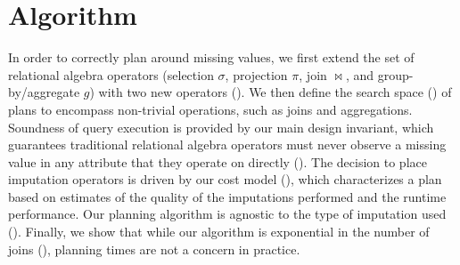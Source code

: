 \section{Algorithm}
\label{sec:algorithm}
In order to correctly plan around missing values, we first extend the set of relational algebra operators (selection $\sigma$, projection $\pi$, join $\bowtie$, and group-by/aggregate $g$) 
with two new operators (). We then define the search space () of plans to encompass non-trivial operations, such as joins and 
aggregations. Soundness of query execution is provided by our main design invariant, which guarantees traditional relational
algebra operators must never observe a missing value in any attribute that they operate on directly (). 
The decision to place imputation operators is driven by our cost model (), which characterizes a plan based on estimates of the 
quality of the imputations performed and the runtime performance. Our planning algorithm is
agnostic to the type of imputation used ().
Finally, we show that while our algorithm is exponential in the number of joins (), planning times are not a concern in practice.

\begin{table}
  \centering
  \caption{}
\end{table}


